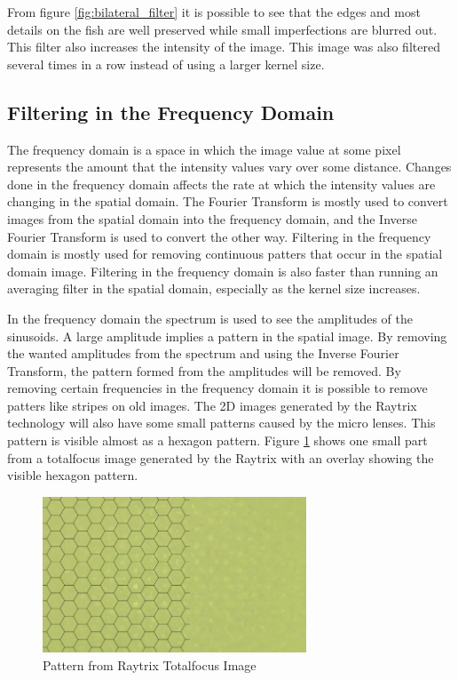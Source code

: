 From figure \ref{fig:bilateral_filter} it is possible to see that the edges and most details on the fish are well preserved while small imperfections are blurred out. This filter also increases the intensity of the image. This image was also filtered several times in a row instead of using a larger kernel size.




\subsection{Filtering in the Frequency Domain}

The frequency domain is a space in which the image value at some pixel represents the amount that the intensity values vary over some distance. Changes done in the frequency domain affects the rate at which the intensity values are changing in the spatial domain.\cite{website:frequency_domain}
The Fourier Transform is mostly used to convert images from the spatial domain into the frequency domain, and the Inverse Fourier Transform is used to convert the other way. 
Filtering in the frequency domain is mostly used for removing continuous patters that occur in the spatial domain image.
Filtering in the frequency domain is also faster than running an averaging filter in the spatial domain, especially as the kernel size increases.\cite{website:frequency_domain_2}\cite{book:digital_image_processing}

In the frequency domain the spectrum is used to see the amplitudes of the sinusoids. A large amplitude implies a pattern in the spatial image. By removing the wanted amplitudes from the spectrum and using the Inverse Fourier Transform, the pattern formed from the amplitudes will be removed.
By removing certain frequencies in the frequency domain it is possible to remove patters like stripes on old images. The 2D images generated by the Raytrix technology will also have some small patterns caused by the micro lenses. This pattern is visible almost as a hexagon pattern.
Figure \ref{fig:hexagon_pattern} shows one small part from a totalfocus image generated by the Raytrix with an overlay showing the visible hexagon pattern.

\begin{figure}[ht]
    \centering
    \includegraphics[width=0.7\textwidth]{images/literature/filtering/pattern_totalfocus}
    \caption{Pattern from Raytrix Totalfocus Image}
    \label{fig:hexagon_pattern}
\end{figure}

